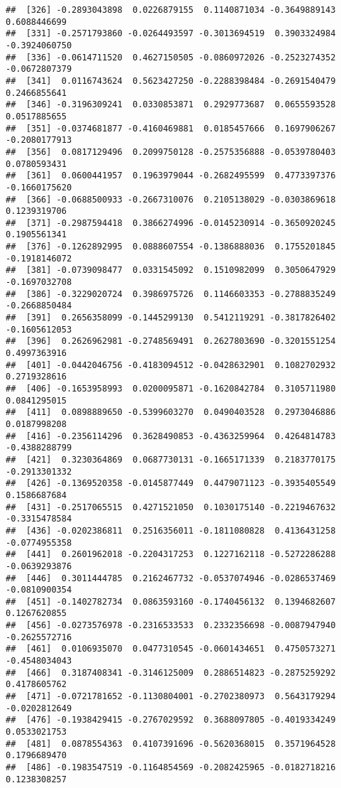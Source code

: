 \documentclass[
]{article}
\begin{document}
\begin{verbatim}
##  [326] -0.2893043898  0.0226879155  0.1140871034 -0.3649889143  0.6088446699
##  [331] -0.2571793860 -0.0264493597 -0.3013694519  0.3903324984 -0.3924060750
##  [336] -0.0614711520  0.4627150505 -0.0860972026 -0.2523274352 -0.0672807379
##  [341]  0.0116743624  0.5623427250 -0.2288398484 -0.2691540479  0.2466855641
##  [346] -0.3196309241  0.0330853871  0.2929773687  0.0655593528  0.0517885655
##  [351] -0.0374681877 -0.4160469881  0.0185457666  0.1697906267 -0.2080177913
##  [356]  0.0817129496  0.2099750128 -0.2575356888 -0.0539780403  0.0780593431
##  [361]  0.0600441957  0.1963979044 -0.2682495599  0.4773397376 -0.1660175620
##  [366] -0.0688500933 -0.2667310076  0.2105138029 -0.0303869618  0.1239319706
##  [371] -0.2987594418  0.3866274996 -0.0145230914 -0.3650920245  0.1905561341
##  [376] -0.1262892995  0.0888607554 -0.1386888036  0.1755201845 -0.1918146072
##  [381] -0.0739098477  0.0331545092  0.1510982099  0.3050647929 -0.1697032708
##  [386] -0.3229020724  0.3986975726  0.1146603353 -0.2788835249 -0.2668850484
##  [391]  0.2656358099 -0.1445299130  0.5412119291 -0.3817826402 -0.1605612053
##  [396]  0.2626962981 -0.2748569491  0.2627803690 -0.3201551254  0.4997363916
##  [401] -0.0442046756 -0.4183094512 -0.0428632901  0.1082702932  0.2719328616
##  [406] -0.1653958993  0.0200095871 -0.1620842784  0.3105711980  0.0841295015
##  [411]  0.0898889650 -0.5399603270  0.0490403528  0.2973046886  0.0187998208
##  [416] -0.2356114296  0.3628490853 -0.4363259964  0.4264814783 -0.4388288799
##  [421]  0.3230364869  0.0687730131 -0.1665171339  0.2183770175 -0.2913301332
##  [426] -0.1369520358 -0.0145877449  0.4479071123 -0.3935405549  0.1586687684
##  [431] -0.2517065515  0.4271521050  0.1030175140 -0.2219467632 -0.3315478584
##  [436] -0.0202386811  0.2516356011 -0.1811080828  0.4136431258 -0.0774955358
##  [441]  0.2601962018 -0.2204317253  0.1227162118 -0.5272286288 -0.0639293876
##  [446]  0.3011444785  0.2162467732 -0.0537074946 -0.0286537469 -0.0810900354
##  [451] -0.1402782734  0.0863593160 -0.1740456132  0.1394682607  0.1267620855
##  [456] -0.0273576978 -0.2316533533  0.2332356698 -0.0087947940 -0.2625572716
##  [461]  0.0106935070  0.0477310545 -0.0601434651  0.4750573271 -0.4548034043
##  [466]  0.3187408341 -0.3146125009  0.2886514823 -0.2875259292  0.4178605762
##  [471] -0.0721781652 -0.1130804001 -0.2702380973  0.5643179294 -0.0202812649
##  [476] -0.1938429415 -0.2767029592  0.3688097805 -0.4019334249  0.0533021753
##  [481]  0.0878554363  0.4107391696 -0.5620368015  0.3571964528  0.1796689470
##  [486] -0.1983547519 -0.1164854569 -0.2082425965 -0.0182718216  0.1238308257

\end{verbatim}
\end{document}
